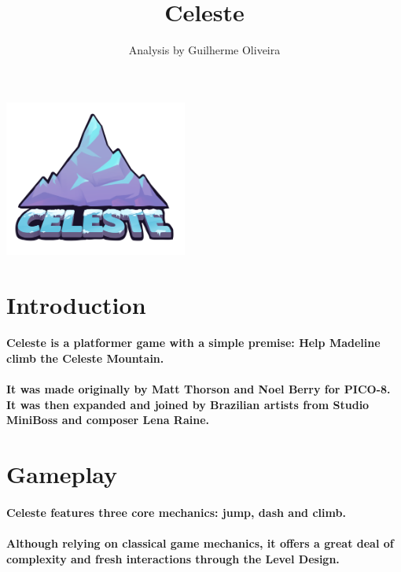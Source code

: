 \documentclass[12pt, twocolumn]{article}
\title{\vspace{-3.0cm}\titlefont Celeste}
\author{Analysis by Guilherme Oliveira}
\date{}
\begin{document}
\maketitle

\begin{center}
\includegraphics[width=6cm]{imgs/cover2.png}
\end{center}

\section*{Introduction}

\paragraph{Celeste is a platformer game with a simple premise: Help Madeline climb the Celeste Mountain.}

\paragraph{It was made originally by Matt Thorson and Noel Berry for PICO-8. It was then expanded and joined by Brazilian artists from Studio MiniBoss and composer Lena Raine.}

\section*{Gameplay}

\paragraph{Celeste features three core mechanics: jump, dash and climb.}

\paragraph{Although relying on classical game mechanics, it offers a great deal of complexity and fresh interactions through the Level Design.}
\end{document}
